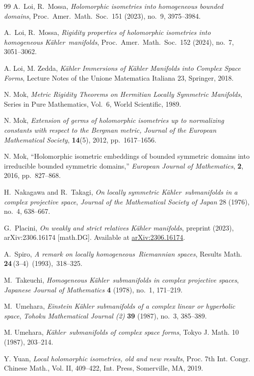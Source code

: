 \documentclass[reqno]{amsart}
\newcommand{\K}{K\"{a}hler}
\begin{document}
\begin{thebibliography}{99}
A.\ Loi, R.\ Mossa,
\emph{Holomorphic isometries into homogeneous bounded domains},
Proc.\ Amer.\ Math.\ Soc.\ 151 (2023), no.~9, 3975--3984.

A.\ Loi, R.\ Mossa,
\emph{Rigidity properties of holomorphic isometries into homogeneous \K\ manifolds},
Proc.\ Amer.\ Math.\ Soc.\ 152 (2024), no.~7, 3051--3062.

A. Loi, M. Zedda, \emph{K\"{a}hler Immersions of K\"{a}hler Manifolds into Complex Space Forms}, Lecture Notes of the Unione Matematica Italiana 23, Springer, 2018.


N. Mok, \textit{Metric Rigidity Theorems on Hermitian Locally Symmetric Manifolds}, Series in Pure Mathematics, Vol.~6, World Scientific, 1989.

N. Mok, \textit{Extension of germs of holomorphic isometries up to normalizing constants with respect to the Bergman metric,} \textit{Journal of the European Mathematical Society}, \textbf{14}(5), 2012, pp.~1617--1656.

N. Mok, ``Holomorphic isometric embeddings of bounded symmetric domains into irreducible bounded symmetric domains,'' \textit{European Journal of Mathematics}, \textbf{2}, 2016, pp.~827--868.


H.~Nakagawa and R.~Takagi, 
\textit{On locally symmetric \K\ submanifolds in a complex projective space}, 
\emph{Journal of the Mathematical Society of Japan} 28 (1976), no.~4, 638--667.

G.~Placini,
{\em On weakly and strict relatives K\"ahler manifolds},
preprint (2023), arXiv:2306.16174 [math.DG].
\newblock Available at \href{https://arxiv.org/abs/2306.16174}{arXiv:2306.16174}.

A.~Spiro, 
\emph{A remark on locally homogeneous Riemannian spaces},  
Results Math. \textbf{24}\,(3–4) (1993), 318–325. 

M.~Takeuchi, 
\textit{Homogeneous \K\ submanifolds in complex projective spaces}, 
\emph{Japanese Journal of Mathematics} \textbf{4} (1978), no.~1, 171--219.

M.~Umehara,
\textit{Einstein K\"ahler submanifolds of a complex linear or hyperbolic space},
\emph{Tohoku Mathematical Journal (2)} \textbf{39} (1987), no.~3, 385--389.


M. Umehara, 
{\em \K\ submanifolds of complex space forms},
Tokyo J. Math. 10 (1987), 203--214.

Y. Yuan,
{\em  Local holomorphic isometries, old and new results},
Proc. 7th Int. Congr. Chinese Math., Vol. II, 409--422, Int. Press, Somerville, MA, 2019.




\end{thebibliography}
\end{document}
